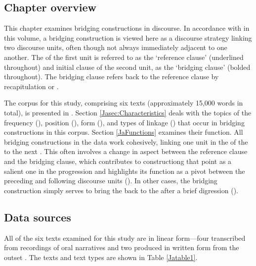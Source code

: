 \documentclass[output=paper]{LSP/langsci}
\begin{document}
\subsection{Chapter overview}
This chapter examines bridging constructions in   discourse. In accordance with \citeauthor{guerin18} in this volume, a bridging construction is viewed here as a discourse  strategy linking two discourse units, often though not always immediately adjacent to one another. The  of the first unit is referred to as the `reference clause' (underlined throughout) and initial clause of the second unit, as the `bridging clause' (bolded throughout). The bridging clause refers back to the reference clause by recapitulation or .

The corpus for this study, comprising six  texts (approximately 15,000 words in total), is presented in . Section \ref{Jasec:Characteristics} deals with the topics of the frequency (), position (), form (), and types of linkage () that occur in bridging constructions in this corpus. Section \ref{JaFunctions} examines their function. All bridging constructions in the data work cohesively, linking one unit in the  of the  to the next \citep[][14--17]{longacre83}. This often involves a change in aspect between the reference clause and the bridging clause, which contributes to constructiong that point as a salient one in the  progression and highlights its function as a pivot between the preceding and following discourse units (). In other cases, the bridging construction simply serves to bring the  back to the  after a brief digression ().
%
%
\subsection{Data sources}
\label{JaData}
All of the six  texts examined for this study are in linear  form—four transcribed from recordings of oral narratives 
\citep{fuller85,johnson92} and two produced in written form from the outset \citep{vang90}. The texts and text types are shown in Table \ref{Jatable1}. 
\end{document}
